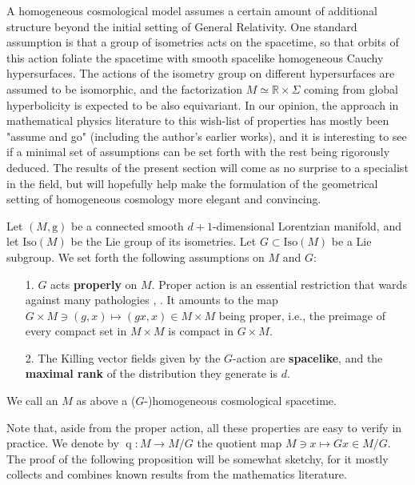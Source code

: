 \documentclass{article}
\begin{document}
A homogeneous cosmological model assumes a certain amount of additional structure beyond the initial setting of General Relativity. One standard assumption is that a group of isometries acts on the spacetime, so that orbits of this action foliate the spacetime with smooth spacelike homogeneous Cauchy hypersurfaces. The actions of the isometry group on different hypersurfaces are assumed to be isomorphic, and the factorization $M\simeq\mathbb{R}\times\Sigma$ coming from global hyperbolicity is expected to be also equivariant. In our opinion, the approach in mathematical physics literature to this wish-list of properties has mostly been "assume and go" (including the author's earlier works), and it is interesting to see if a minimal set of assumptions can be set forth with the rest being rigorously deduced. The results of the present section will come as no surprise to a specialist in the field, but will hopefully help make the formulation of the geometrical setting of homogeneous cosmology more elegant and convincing.

Let $(M,\mathrm{g})$ be a connected smooth $d+1$-dimensional Lorentzian manifold, and let $\mathrm{Iso}(M)$ be the Lie group of its isometries. Let $G\subset\mathrm{Iso}(M)$ be a Lie subgroup. We set forth the following assumptions on $M$ and $G$:

\begin{itemize}

\item[1.] $G$ acts {\bf properly} on $M$. Proper action is an essential restriction that wards against many pathologies \cite{BerndtDiazVanaei2017}, \cite{RudolphSchmidt2013}. It amounts to the map $G\times M\ni(g,x)\mapsto (gx,x)\in M\times M$ being proper, i.e., the preimage of every compact set in $M\times M$ is compact in $G\times M$.

\item[2.] The Killing vector fields given by the $G$-action are {\bf spacelike}, and the {\bf maximal rank} of the distribution they generate is $d$.

\end{itemize}

\begin{definition} We call an $M$ as above a ($G$-)homogeneous cosmological spacetime.
\end{definition}

\noindent Note that, aside from the proper action, all these properties are easy to verify in practice. We denote by $\operatorname{q}:M\to M/G$ the quotient map $M\ni x\mapsto Gx\in M/G$. The proof of the following proposition will be somewhat sketchy, for it mostly collects and combines known results from the mathematics literature.
\end{document}
